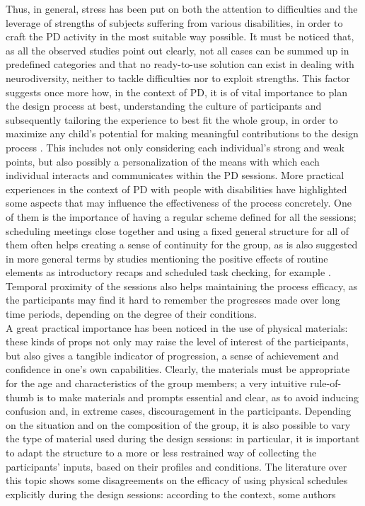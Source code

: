 Thus, in general, stress has been put on both the attention to difficulties and the leverage of strengths of subjects suffering from various disabilities, in order to craft the PD activity in the most suitable way possible. It must be noticed that, as all the observed studies point out clearly, not all cases can be summed up in predefined categories and that no ready-to-use solution can exist in dealing with neurodiversity, neither to tackle difficulties nor to exploit strengths. This factor suggests once more how, in the context of PD, it is of vital importance to plan the design process at best, understanding the culture of participants and subsequently tailoring the experience to best fit the whole group, in order to maximize any child's potential for making meaningful contributions to the design process \cite{Benton}. This includes not only considering each individual's strong and weak points, but also possibly a personalization of the means with which each individual interacts and communicates within the PD sessions.
More practical experiences \cite{Malinverni} in the context of PD with people with disabilities have highlighted some aspects that may influence the effectiveness of the process concretely. One of them is the importance of having a regular scheme defined for all the sessions; scheduling meetings close together and using a fixed general structure for all of them often helps creating a sense of continuity for the group, as is also suggested in more general terms by studies mentioning the positive effects of routine elements as introductory recaps and scheduled task checking, for example \cite{Benton}. Temporal proximity of the sessions also helps maintaining the process efficacy, as the participants may find it hard to remember the progresses made over long time periods, depending on the degree of their conditions.\\
A great practical importance has been noticed in the use of physical materials: these kinds of props not only may raise the level of interest of the participants, but also gives a tangible indicator of progression, a sense of achievement and confidence in one's own capabilities. Clearly, the materials must be appropriate for the age and characteristics of the group members; a very intuitive rule-of-thumb is to make materials and prompts essential and clear, as to avoid inducing confusion and, in extreme cases, discouragement in the participants. Depending on the situation and on the composition of the group, it is also possible to vary the type of material used during the design sessions: in particular, it is important to adapt the structure to a more or less restrained way of collecting the participants' inputs, based on their profiles and conditions. The literature over this topic shows some disagreements on the efficacy of using physical schedules explicitly during the design sessions: according to the context, some authors
